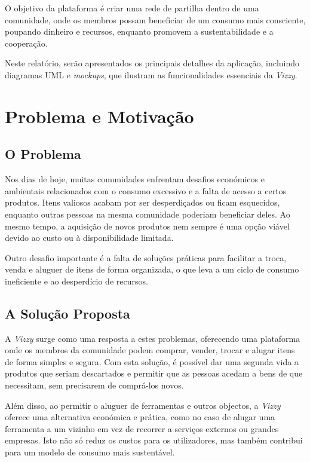 \documentclass[a4paper, 12pt]{article} %
\begin{document}
O objetivo da plataforma é criar uma rede de partilha dentro de uma comunidade, onde os membros possam beneficiar de um consumo mais consciente, poupando dinheiro e recursos, enquanto promovem a sustentabilidade e a cooperação.

Neste relatório, serão apresentados os principais detalhes da aplicação, incluindo diagramas UML e \textit{mockups}, que ilustram as funcionalidades essenciais da \textit{Vizzy}.

\newpage
\section{Problema e Motivação}

\subsection{O Problema}

Nos dias de hoje, muitas comunidades enfrentam desafios económicos e ambientais relacionados com o consumo excessivo e a falta de acesso a certos produtos. Itens valiosos acabam por ser desperdiçados ou ficam esquecidos, enquanto outras pessoas na mesma comunidade poderiam beneficiar deles. Ao mesmo tempo, a aquisição de novos produtos nem sempre é uma opção viável devido ao custo ou à disponibilidade limitada.

Outro desafio importante é a falta de soluções práticas para facilitar a troca, venda e aluguer de itens de forma organizada, o que leva a um ciclo de consumo ineficiente e ao desperdício de recursos.

\subsection{A Solução Proposta}

A \textit{Vizzy} surge como uma resposta a estes problemas, oferecendo uma plataforma onde os membros da comunidade podem comprar, vender, trocar e alugar itens de forma simples e segura. Com esta solução, é possível dar uma segunda vida a produtos que seriam descartados e permitir que as pessoas acedam a bens de que necessitam, sem precisarem de comprá-los novos.

Além disso, ao permitir o aluguer de ferramentas e outros objectos, a \textit{Vizzy} oferece uma alternativa económica e prática, como no caso de alugar uma ferramenta a um vizinho em vez de recorrer a serviços externos ou grandes empresas. Isto não só reduz os custos para os utilizadores, mas também contribui para um modelo de consumo mais sustentável.
\end{document}
